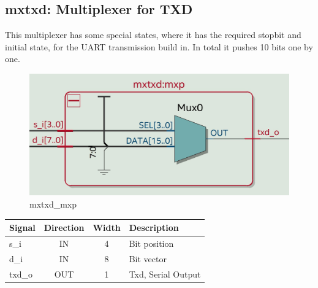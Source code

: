 \documentclass[12pt,a4 paper] {report}
\begin{document}
\subsection{mxtxd: Multiplexer for TXD}
This multiplexer has some special states, where it has the required stopbit and initial state, for the UART transmission 
build in. In total it pushes 10 bits one by one.
\begin{figure}[h]
	\centering	
	\includegraphics[scale=0.15]{../png/mxtxd_mxp.png}
	\caption{mxtxd\_mxp}
\end{figure}
\begin{center}
	\begin{tabular}{ | p{2cm} | c | c | p{5cm} |}
		\hline
		\textbf{Signal} & \textbf{Direction} & \textbf{Width} & \textbf{Description} \\
		\hline
		s\_i & IN & 4 & Bit position \\
		\hline
		d\_i & IN & 8 & Bit vector \\
		\hline
		txd\_o & OUT & 1 & Txd, Serial Output \\
		\hline
	\end{tabular}
\end{center} 

\newpage
\end{document}
